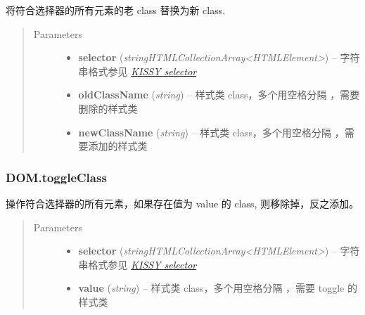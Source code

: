 \documentclass[letterpaper,10pt,english]{sphinxmanual}
\begin{document}
\begin{fulllineitems}
\label{api/core/dom/replaceClass:DOM.replaceClass}
将符合选择器的所有元素的老 class 替换为新 class.
\begin{quote}\begin{description}
\item[{Parameters}] \leavevmode\begin{itemize}
\item {}
\textbf{selector} (\emph{string\textbar{}HTMLCollection\textbar{}Array\textless{}HTMLElement\textgreater{}}) -- 字符串格式参见 {\hyperref[api/core/dom/selector:dom-selector]{\emph{KISSY selector}}}

\item {}
\textbf{oldClassName} (\emph{string}) -- 样式类 class，多个用空格分隔 ，需要删除的样式类

\item {}
\textbf{newClassName} (\emph{string}) -- 样式类 class，多个用空格分隔 ，需要添加的样式类

\end{itemize}

\end{description}\end{quote}

\end{fulllineitems}



\subsubsection{DOM.toggleClass}
\label{api/core/dom/toggleClass:dom-toggleclass}\label{api/core/dom/toggleClass::doc}

\begin{fulllineitems}
\label{api/core/dom/toggleClass:DOM.toggleClass}
操作符合选择器的所有元素，如果存在值为 value 的 class, 则移除掉，反之添加。
\begin{quote}\begin{description}
\item[{Parameters}] \leavevmode\begin{itemize}
\item {}
\textbf{selector} (\emph{string\textbar{}HTMLCollection\textbar{}Array\textless{}HTMLElement\textgreater{}}) -- 字符串格式参见 {\hyperref[api/core/dom/selector:dom-selector]{\emph{KISSY selector}}}

\item {}
\textbf{value} (\emph{string}) -- 样式类 class，多个用空格分隔 ，需要 toggle 的样式类

\end{itemize}

\end{description}\end{quote}

\end{fulllineitems}
\end{document}
